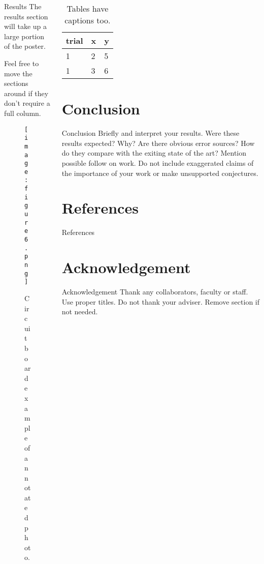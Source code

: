 \documentclass[pdf]{beamer}
\begin{document}
\begin{frame}[fragile]
\begin{columns}
\begin{column}{0.25\textwidth}
\begin{block}{Results}
The results section will take up a large portion of the poster.  

Feel free to move the sections around if they don’t require a full column. 

\begin{figure}
\texttt{[image: figure6.png]}
\caption{Circuit board example of annotated photo.}
\end{figure}
\end{block}
\end{column}

\begin{column}{0.25\textwidth}
\begin{table}
\caption{Tables have captions too.}
\begin{tabular}{lll}
\toprule
trial & x & y \\
\midrule
1 & 2 & 5 \\
1 & 3 & 6 \\
\bottomrule
\end{tabular}
\end{table}

\section{Conclusion}
\begin{block}{Conclusion}
Briefly and interpret your results. Were these results expected? Why? Are there obvious error sources? How do they compare with the exiting state of the art?   Mention possible follow on work.   Do not include exaggerated claims of the importance of your work or make unsupported conjectures. 
\end{block}

\section*{References}
\begin{block}{References}
\nocite{bingulac1994on, vidmar2018on}


\end{block}

\section*{Acknowledgement}
\begin{block}{Acknowledgement}
Thank any collaborators, faculty or staff. Use proper titles.  Do not thank your adviser. Remove section if not needed.
\end{block}
\end{column}

\end{columns}
\end{frame}
\end{document}
